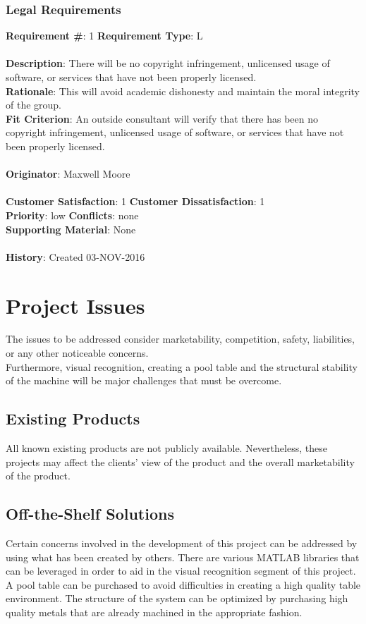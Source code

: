\documentclass[titlepage]{article}
\begin{document}
\subsubsection{Legal Requirements}
\begin{framed}
	\noindent\textbf{Requirement \#}: 1 \hfill \textbf{Requirement Type}: L\hfill\\\\
	\noindent\textbf{Description}: There will be no copyright infringement, unlicensed usage of software, or services that have not been properly licensed.\\
	\textbf{Rationale}: This will avoid academic dishonesty and maintain the moral integrity of the group.\\
	\textbf{Fit Criterion}: An outside consultant will verify that there has been no copyright infringement, unlicensed usage of software, or services that have not been properly licensed.\\\\
	\textbf{Originator}: Maxwell Moore\\\\
	\noindent\textbf{Customer Satisfaction}: 1 \hfill 	\textbf{Customer Dissatisfaction}: 1 \hfill\\
	\textbf{Priority}: low \hfill \textbf{Conflicts}: none \hfill\\
	\textbf{Supporting Material}: None\\\\
	\noindent\textbf{History}: Created 03-NOV-2016
\end{framed}



\section{Project Issues}
The issues to be addressed consider marketability, competition, safety, liabilities, or any other noticeable concerns.\\
Furthermore, visual recognition, creating a pool table and the structural stability of the machine will be major challenges that must be overcome.
\subsection{Existing Products}
All known existing products are not publicly available. Nevertheless, these projects may affect the clients' view of the product and the overall marketability of the product.

\subsection{Off-the-Shelf Solutions}
Certain concerns involved in the development of this project can be addressed by using what has been created by others. There are various MATLAB libraries that can be leveraged in order to aid in the visual recognition segment of this project. A pool table can be purchased to avoid difficulties in creating a high quality table environment. The structure of the system can be optimized by purchasing high quality metals that are already machined in the appropriate fashion.
\end{document}
